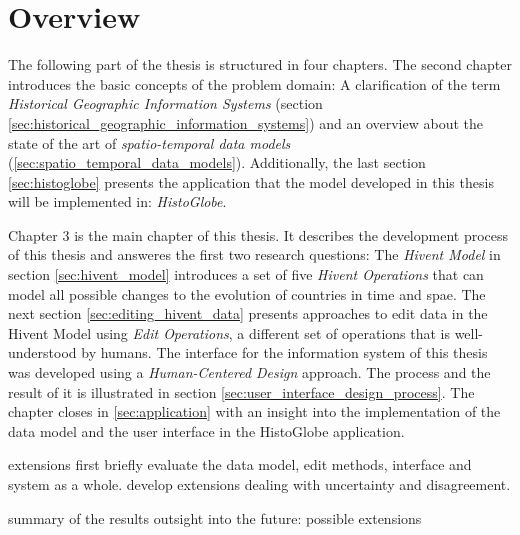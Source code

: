 \section{Overview} %
\label{sec:overview}

The following part of the thesis is structured in four chapters. The second chapter introduces the basic concepts of the problem domain: A clarification of the term \emph{Historical Geographic Information Systems} (section \ref{sec:historical_geographic_information_systems}) and an overview about the state of the art of \emph{spatio-temporal data models} (\ref{sec:spatio_temporal_data_models}). Additionally, the last section \ref{sec:histoglobe} presents the application that the model developed in this thesis will be implemented in: \emph{HistoGlobe}.

Chapter 3 is the main chapter of this thesis. It describes the development process of this thesis and answeres the first two research questions: The \emph{Hivent Model} in section \ref{sec:hivent_model} introduces a set of five \emph{Hivent Operations} that can model all possible changes to the evolution of countries in time and spae. The next section \ref{sec:editing_hivent_data} presents approaches to edit data in the Hivent Model using \emph{Edit Operations}, a different set of operations that is well-understood by humans. The interface for the information system of this thesis was developed using a \emph{Human-Centered Design} approach. The process and the result of it is illustrated in section \ref{sec:user_interface_design_process}. The chapter closes in \ref{sec:application} with an insight into the implementation of the data model and the user interface in the HistoGlobe application.

extensions
first briefly evaluate the data model, edit methods, interface and system as a whole.
develop extensions dealing with uncertainty and disagreement.

summary of the results
outsight into the future: possible extensions



